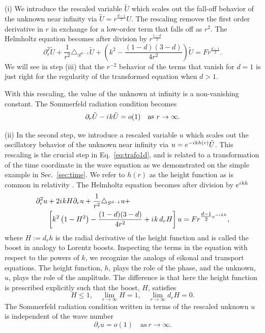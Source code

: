 \documentclass[final,onefignum,onetabnum]{siamart190516}
\newcommand{\iu}{{i\mkern1mu}}
\begin{document}
(i) We introduce the rescaled variable $\tilde{U}$ which scales out the fall-off behavior of the unknown near infinity via $\tilde{U} = r^{\tfrac{d-1}{2}} U$. The rescaling removes the first order derivative in $r$ in exchange for a low-order term that falls off as $r^2$. The Helmholtz equation becomes after division by $r^{\tfrac{1-d}{2}}$
\[ \partial_r^2 \tilde{U} + \frac{1}{r^2}\triangle_{S^{d-1}} \tilde{U} + \left(k^2 - \frac{(1-d)(3-d)}{4 r^2} \right) \tilde{U} = F r^{\tfrac{d-1}{2}}. \]
We will see in step (iii) that the $r^{-2}$ behavior of the terms that vanish for $d=1$ is just right for the regularity of the transformed equation when $d>1$. 

With this rescaling, the value of the unknown at infinity is a non-vanishing constant. The Sommerfeld radiation condition becomes
\[ \partial_r \tilde{U} - \iu k \tilde{U} = o(1) \quad \mathrm{as} \ r\to\infty. \]

(ii) In the second step, we introduce a rescaled variable $u$ which scales out the oscillatory behavior of the unknown near infinity via $u=e^{-\iu k h(r)} \tilde{U}$. This rescaling is the crucial step in Eq.~\eqref{eq:trafo1d}, and is related to a transformation of the time coordinate in the wave equation \cite{ZengFramework} as we demonstrated on the simple example in Sec.~\ref{sec:time}. We refer to $h(r)$ as the height function as is common in relativity \cite{reinhart1973maximal, beig1996vacuum}. The Helmholtz equation becomes after division by $e^{\iu k h}$
\begin{align*}
	\partial_r^2 u & + 2 \iu k H \partial_r u + \frac{1}{r^2}\triangle_{S^{d-1}} u +                                        \\
	        & \left[k^2 \left(1- H^2\right) - \frac{(1-d)(3-d)}{4 r^2} + \iu k \, d_r H \right] u = F r^{\tfrac{d-1}{2} e^{-\iu k h}},
\end{align*}
where $H:=d_r h$ is the radial derivative of the height function and is called the boost in analogy to Lorentz boosts. Inspecting the terms in the equation with respect to the powers of $k$, we recognize the analogs of eikonal and transport equations. The height function, $h$, plays the role of the phase, and the unknown, $u$, plays the role of the amplitude. The difference is that here the height function is prescribed explicitly such that the boost, $H$, satisfies \cite{Zenginoglu08, ZengFramework, jaramillo2021pseudospectrum}
\begin{equation} \label{eq:h_cond}
	H \leq 1, \quad \lim_{r\to\infty} H = 1, \quad \lim_{r\to\infty} d_r H = 0. %
\end{equation}
The Sommerfeld radiation condition written in terms of the rescaled unknown $u$ is independent of the wave number
\[ \partial_r u = o(1) \quad \mathrm{as} \ r\to\infty. \]
\end{document}
